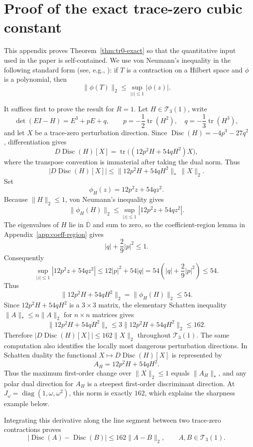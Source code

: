 \documentclass[11pt]{article}
\numberwithin{equation}{section}
\DeclareMathOperator{\Disc}{Disc}
\DeclareMathOperator{\tr}{tr}
\newcommand{\bbD}{\mathbb D}
\newcommand{\cT}{\mathcal T}
\begin{document}
\section{Proof of the exact trace-zero cubic constant}\label{app:tr0-proof}

This appendix proves Theorem~\ref{thm:tr0-exact} so that the quantitative
input used in the paper is self-contained.  We use
von Neumann's inequality in the following standard form (see, e.g.,
\cite{Halmos1982}): if \(T\) is a contraction on a Hilbert space and
\(\phi\) is a polynomial, then
\[
  \|\phi(T)\|_2\le \sup_{|z|\le1}|\phi(z)|.
\]

It suffices first to prove the result for \(R=1\).  Let \(H\in\cT_3(1)\),
write
\[
  \det(EI-H)=E^3+pE+q,
  \qquad
  p=-\frac12\tr(H^2),\quad q=-\frac13\tr(H^3),
\]
and let \(X\) be a trace-zero perturbation direction.  Since
\(\Disc(H)=-4p^3-27q^2\), differentiation gives
\[
  D\Disc(H)[X]
  =\tr\bigl((12p^2H+54qH^2)X\bigr),
\]
where the transpose convention is immaterial after taking the dual norm.
Thus
\[
  |D\Disc(H)[X]|
  \le \|12p^2H+54qH^2\|_*\,\|X\|_2.
\]
Set
\[
  \phi_H(z)=12p^2z+54qz^2.
\]
Because \(\|H\|_2\le1\), von Neumann's inequality gives
\[
  \|\phi_H(H)\|_2\le \sup_{|z|\le1}|12p^2z+54qz^2|.
\]
The eigenvalues of \(H\) lie in \(\overline{\bbD}\) and sum to zero, so
the coefficient-region lemma in Appendix~\ref{app:coeff-region} gives
\[
  |q|+\frac{2}{9}|p|^2\le1.
\]
Consequently
\[
  \sup_{|z|\le1}|12p^2z+54qz^2|
  \le 12|p|^2+54|q|
  =54\left(|q|+\frac{2}{9}|p|^2\right)
  \le54.
\]
Thus
\[
  \|12p^2H+54qH^2\|_2=\|\phi_H(H)\|_2\le54.
\]
Since \(12p^2H+54qH^2\) is a \(3\times3\) matrix, the elementary
Schatten inequality \(\|A\|_*\le n\|A\|_2\) for \(n\times n\) matrices gives
\[
  \|12p^2H+54qH^2\|_*
  \le3\|12p^2H+54qH^2\|_2
  \le162.
\]
Therefore \(|D\Disc(H)[X]|\le162\|X\|_2\) throughout \(\cT_3(1)\).
The same computation also identifies the locally most dangerous perturbation
directions.  In Schatten duality the functional
\(X\mapsto D\Disc(H)[X]\) is represented by
\[
  A_H=12p^2H+54qH^2.
\]
Thus the maximum first-order change over \(\|X\|_2\le1\) equals
\(\|A_H\|_*\), and any polar dual direction for \(A_H\) is a steepest
first-order discriminant direction.  At
\(J_\omega=\operatorname{diag}(1,\omega,\omega^2)\), this norm is exactly
\(162\), which explains the sharpness example below.

Integrating
this derivative along the line segment between two trace-zero contractions
proves
\[
  |\Disc(A)-\Disc(B)|\le162\|A-B\|_2,
  \qquad A,B\in\cT_3(1).
\]
\end{document}
